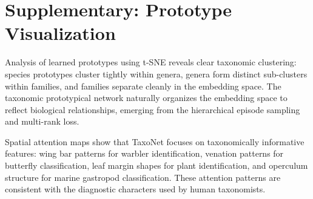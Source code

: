 \documentclass[11pt,a4paper]{article}
\begin{document}
\section{Supplementary: Prototype Visualization}
\label{app:visualization}

Analysis of learned prototypes using t-SNE reveals clear taxonomic
clustering: species prototypes cluster tightly within genera, genera form
distinct sub-clusters within families, and families separate cleanly in
the embedding space. The taxonomic prototypical network naturally
organizes the embedding space to reflect biological relationships,
emerging from the hierarchical episode sampling and multi-rank loss.

Spatial attention maps show that TaxoNet focuses on taxonomically
informative features: wing bar patterns for warbler identification,
venation patterns for butterfly classification, leaf margin shapes for
plant identification, and operculum structure for marine gastropod
classification. These attention patterns are consistent with the
diagnostic characters used by human taxonomists.
\end{document}
